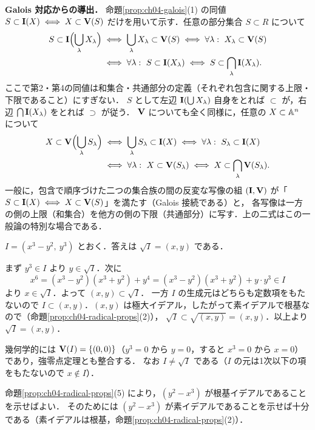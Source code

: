 \textbf{Galois 対応からの導出．}
命題\ref{prop:ch04-galois}(1) の同値 $S\subset\mathbf{I}(X)\iff X\subset\mathbf{V}(S)$ だけを用いて示す．任意の部分集合 $S\subset R$ について
\[
  \begin{aligned}
  S\subset\mathbf{I}\Bigl(\bigcup_\lambda X_\lambda\Bigr)
  &\iff\bigcup_\lambda X_\lambda\subset\mathbf{V}(S)
  \iff\forall\lambda:\ X_\lambda\subset\mathbf{V}(S)\\
  &\iff\forall\lambda:\ S\subset\mathbf{I}(X_\lambda)
  \iff S\subset\bigcap_\lambda\mathbf{I}(X_\lambda).
  \end{aligned}
\]
ここで第2・第4の同値は和集合・共通部分の定義（それぞれ包含に関する上限・下限であること）にすぎない．
$S$ として左辺 $\mathbf{I}(\bigcup X_\lambda)$ 自身をとれば $\subset$ が，右辺 $\bigcap\mathbf{I}(X_\lambda)$ をとれば $\supset$ が従う．
$\mathbf{V}$ についても全く同様に，任意の $X\subset\mathbb{A}^n$ について
\[
  \begin{aligned}
  X\subset\mathbf{V}\Bigl(\bigcup_\lambda S_\lambda\Bigr)
  &\iff\bigcup_\lambda S_\lambda\subset\mathbf{I}(X)
  \iff\forall\lambda:\ S_\lambda\subset\mathbf{I}(X)\\
  &\iff\forall\lambda:\ X\subset\mathbf{V}(S_\lambda)
  \iff X\subset\bigcap_\lambda\mathbf{V}(S_\lambda).
  \end{aligned}
\]
一般に，包含で順序づけた二つの集合族の間の反変な写像の組 $(\mathbf{I},\mathbf{V})$ が「$S\subset\mathbf{I}(X)\iff X\subset\mathbf{V}(S)$」を満たす（Galois 接続である）と，
各写像は一方の側の上限（和集合）を他方の側の下限（共通部分）に写す．上の二式はこの一般論の特別な場合である．

$I=(x^3-y^2,\ y^3)$ とおく．答えは $\sqrt I=(x,y)$ である．

まず $y^3\in I$ より $y\in\sqrt I$．次に
\[
  x^6=(x^3-y^2)(x^3+y^2)+y^4=(x^3-y^2)(x^3+y^2)+y\cdot y^3\in I
\]
より $x\in\sqrt I$．よって $(x,y)\subset\sqrt I$．
一方 $I$ の生成元はどちらも定数項をもたないので $I\subset(x,y)$．$(x,y)$ は極大イデアル，したがって素イデアルで根基なので（命題\ref{prop:ch04-radical-props}(2)），
$\sqrt I\subset\sqrt{(x,y)}=(x,y)$．以上より $\sqrt I=(x,y)$．

幾何学的には $\mathbf{V}(I)=\{(0,0)\}$（$y^3=0$ から $y=0$，すると $x^3=0$ から $x=0$）であり，強零点定理とも整合する．
なお $I\ne\sqrt I$ である（$I$ の元は1次以下の項をもたないので $x\notin I$）．

命題\ref{prop:ch04-radical-props}(5) により，$(y^2-x^3)$ が根基イデアルであることを示せばよい．
そのためには $(y^2-x^3)$ が素イデアルであることを示せば十分である（素イデアルは根基，命題\ref{prop:ch04-radical-props}(2)）．


